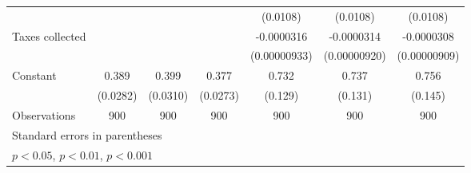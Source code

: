 {\begin{tabular}{l*{6}{c}}
                    &                     &                     &                     &    (0.0108)         &    (0.0108)         &    (0.0108)         \\
[1em]
Taxes collected     &                     &                     &                     &  -0.0000316\sym{**} &  -0.0000314\sym{***}&  -0.0000308\sym{**} \\
                    &                     &                     &                     &(0.00000933)         &(0.00000920)         &(0.00000909)         \\
[1em]
Constant            &       0.389\sym{***}&       0.399\sym{***}&       0.377\sym{***}&       0.732\sym{***}&       0.737\sym{***}&       0.756\sym{***}\\
                    &    (0.0282)         &    (0.0310)         &    (0.0273)         &     (0.129)         &     (0.131)         &     (0.145)         \\
\hline
Observations        &         900         &         900         &         900         &         900         &         900         &         900         \\
\hline\hline
\multicolumn{7}{l}{\footnotesize Standard errors in parentheses}\\
\multicolumn{7}{l}{\footnotesize \sym{*} \(p<0.05\), \sym{**} \(p<0.01\), \sym{***} \(p<0.001\)}\\
\end{tabular}
}
